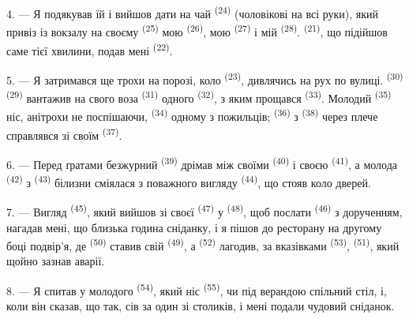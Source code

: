 4. --- Я подякував їй і вийшов дати на чай 
\textsuperscript{(24)} (чоловікові на всі руки), який привіз із вокзалу на своєму
 \textsuperscript{(25)} мою 
\textsuperscript{(26)}, мою  \textsuperscript{(27)} і мій
 \textsuperscript{(28)}. 
\textsuperscript{(21)}, що підійшов саме тієї хвилини, подав мені 
\textsuperscript{(22)}.

5. --- Я затримався ще трохи на порозі, коло 
\textsuperscript{(23)}, дивлячись на рух по вулиці. 
\textsuperscript{(30)}  \textsuperscript{(29)} вантажив на свого
воза  \textsuperscript{(31)} одного 
\textsuperscript{(32)}, з яким прощався 
\textsuperscript{(33)}. Молодий  \textsuperscript{(35)} ніс,
анітрохи не поспішаючи,  \textsuperscript{(34)} одному з
пожильців;  \textsuperscript{(36)} з  \textsuperscript{(38)} через плече справлявся зі своїм
 \textsuperscript{(37)}.

\VUsaut{4.0mm}
\VUsaut{3.0mm}

6. --- Перед ґратами безжурний  \textsuperscript{(39)} дрімав
між своїми  \textsuperscript{(40)} і своєю  \textsuperscript{(41)}, а молода 
\textsuperscript{(42)} з  \textsuperscript{(43)} білизни сміялася
з поважного вигляду  \textsuperscript{(44)}, що стояв коло
дверей.

7. --- Вигляд  \textsuperscript{(45)}, який вийшов зі своєї
 \textsuperscript{(47)} у  \textsuperscript{(48)},
щоб послати  \textsuperscript{(46)} з дорученням, нагадав мені,
що близька година сніданку, і я пішов до ресторану на другому боці подвір'я, де
 \textsuperscript{(50)} ставив свій 
\textsuperscript{(49)}, а  \textsuperscript{(52)} лагодив, за
вказівками  \textsuperscript{(53)},  \textsuperscript{(51)}, який щойно зазнав аварії.

8. --- Я спитав у молодого  \textsuperscript{(54)}, який ніс
 \textsuperscript{(55)}, чи під верандою спільний стіл, і,
коли він сказав, що так, сів за один зі столиків, і мені подали чудовий
сніданок.

